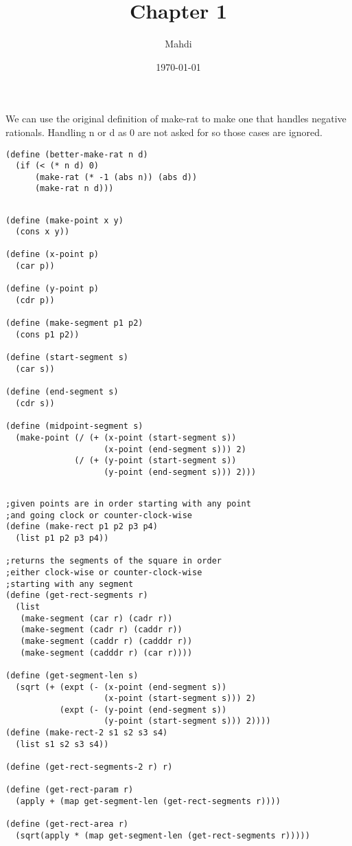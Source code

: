 \documentclass{article}
\title{Chapter 1}
\author{Mahdi}
\date\today
\begin{document}
\subsection{}
We can use the original definition of make-rat to make one that handles negative rationals. Handling n or d as 0 are not asked for so those cases are ignored.
\begin{verbatim}
(define (better-make-rat n d)
  (if (< (* n d) 0)
      (make-rat (* -1 (abs n)) (abs d))
      (make-rat n d)))
\end{verbatim}
\subsection{}
\begin{verbatim}
(define (make-point x y)
  (cons x y))

(define (x-point p)
  (car p))

(define (y-point p)
  (cdr p))

(define (make-segment p1 p2)
  (cons p1 p2))

(define (start-segment s)
  (car s))

(define (end-segment s)
  (cdr s))

(define (midpoint-segment s)
  (make-point (/ (+ (x-point (start-segment s))
                    (x-point (end-segment s))) 2)
              (/ (+ (y-point (start-segment s))
                    (y-point (end-segment s))) 2)))
\end{verbatim}
\subsection{}
\begin{verbatim}
;given points are in order starting with any point
;and going clock or counter-clock-wise
(define (make-rect p1 p2 p3 p4)
  (list p1 p2 p3 p4))

;returns the segments of the square in order
;either clock-wise or counter-clock-wise
;starting with any segment
(define (get-rect-segments r)
  (list
   (make-segment (car r) (cadr r))
   (make-segment (cadr r) (caddr r))
   (make-segment (caddr r) (cadddr r))
   (make-segment (cadddr r) (car r))))

(define (get-segment-len s)
  (sqrt (+ (expt (- (x-point (end-segment s))
                    (x-point (start-segment s))) 2)
           (expt (- (y-point (end-segment s))
                    (y-point (start-segment s))) 2))))
(define (make-rect-2 s1 s2 s3 s4)
  (list s1 s2 s3 s4))

(define (get-rect-segments-2 r) r)

(define (get-rect-param r)
  (apply + (map get-segment-len (get-rect-segments r))))

(define (get-rect-area r)
  (sqrt(apply * (map get-segment-len (get-rect-segments r)))))
\end{verbatim}
\end{document}
